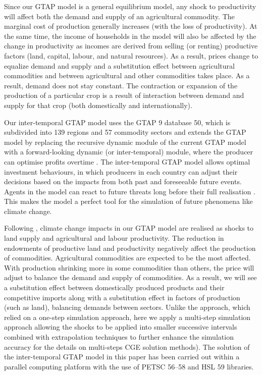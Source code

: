 Since our GTAP model is a general equilibrium model, any shock to productivity will affect both the demand and supply of an agricultural commodity. The marginal cost of production generally increases (with the loss of productivity). At the same time, the income of households in the model will also be affected by the change in productivity as incomes are derived from selling (or renting) productive factors (land, capital, labour, and natural resources). As a result, prices change to equalize demand and supply and a substitution effect between agricultural commodities and between agricultural and other commodities takes place. As a result, demand does not stay constant. The contraction or expansion of the production of a particular crop is a result of interaction between demand and supply for that crop (both domestically and internationally). 

Our inter-temporal GTAP model uses the GTAP 9 database 50, which is subdivided into 139 regions and 57 commodity sectors \citep{aguiar_overview_2016} and extends the GTAP model by replacing the recursive dynamic module of the current GTAP model with a forward-looking dynamic (or inter-temporal) module, where the producer can optimise profits overtime \citep{van_ha_building_2017, kompas_effects_2018}. The inter-temporal GTAP model allows optimal investment behaviours, in which producers in each country can adjust their decisions based on the impacts from both past and foreseeable future events. Agents in the model can react to future threats long before their full realisation \citep{kompas_effects_2018}. This makes the model a perfect tool for the simulation of future phenomena like climate change.

Following \citet{roson_estimation_2016}, climate change impacts in our GTAP model are realised as shocks to land supply and agricultural and labour productivity. The reduction in endowments of productive land and productivity negatively affect the production of commodities. Agricultural commodities are expected to be the most affected. With production shrinking more in some commodities than others, the price will adjust to balance the demand and supply of commodities. As a result, we will see a substitution effect between domestically produced products and their competitive imports along with a substitution effect in factors of production (such as land), balancing demands between sectors.
Unlike the \citet{kompas_effects_2018} approach, which relied on a one-step simulation approach, here we apply a multi-step simulation approach allowing the shocks to be applied into smaller successive intervals combined with extrapolation techniques to further enhance the simulation accuracy \citep[see]{horridge_gempack_2018,pearson_solving_1991} for the details on multi-steps CGE solution methods). The solution of the inter-temporal GTAP model in this paper has been carried out within a parallel computing platform \citep{van_ha_solving_2016, kompas_curse_2018} with the use of PETSC 56–58 and HSL 59 libraries.

